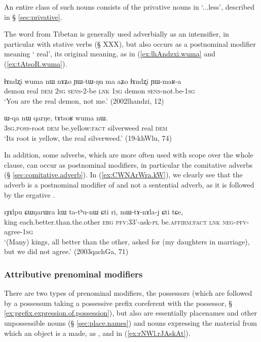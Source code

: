 An entire class of such nouns consists of the privative nouns in  `...less', described in § \ref{sec:privative}.

The word  from Tibetan  is generally used adverbially as an intensifier, in particular with stative verbs (§ XXX), but also occurs as a postnominal modifier meaning ` real', its original meaning, as in (\ref{ex:lhAndzxi.wuma} and (\ref{ex:tAtsoR.wuma}).

\begin{exe}
\ex \label{ex:lhAndzxi.wuma}
\gll ɬɤndʐi wuma nɯ nɤʑo ɲɯ-tɯ-ŋu ma aʑo ɬɤndʐi ɲɯ-maʁ-a \\
demon real \textsc{dem} \textsc{2sg} \textsc{sens}-2-be \textsc{lnk} \textsc{1sg} demon \textsc{sens}-not.be-\textsc{1sg} \\
\glt `You are the real demon, not me.' (2002lhandzi, 12)
\end{exe}

\begin{exe}
\ex \label{ex:tAtsoR.wuma}
\gll ɯ-qa nɯ qarŋe, tɤtsoʁ wuma nɯ. \\
\textsc{3sg}.\textsc{poss}-root \textsc{dem} be.yellow:\textsc{fact} silverweed real \textsc{dem} \\
\glt `Its root is yellow, the real silverweed.' (19-khWlu, 74)
\end{exe}

In addition, some adverbs, which are more often used with scope over the whole clause, can occur as postnominal modifiers, in particular the comitative adverbs (§ \ref{sec:comitative.adverb}). In (\ref{ex:CWNArWra.kW}), we clearly see that the adverb  is a postnominal modifier of  and not a sentential adverb, as it is followed by the ergative .

\begin{exe}
\ex \label{ex:CWNArWra.kW}
\gll   rɟɤlpu ɕɯŋarɯra kɯ ta-tʰu-nɯ ɕti ri, mɯ-tɤ-nɤla-j ɕti tɕe, \\
king each.better.than.the.other \textsc{erg} \textsc{pfv}:3\fl{}3'-ask-\textsc{pl} be.\textsc{affirm}:\textsc{fact} \textsc{lnk} \textsc{neg}-\textsc{pfv}-agree-\textsc{1sg} \\
\glt `(Many) kings, all better than the other, asked for (my daughters in marriage), but we did not agree.' (2003qachGa, 71)
\end{exe}

\subsubsection{Attributive prenominal modifiers}   \label{ex:attributive.prenominal}
There are two types of prenominal modifiers, the possessors (which are followed by a possessum taking a possessive prefix coreferent with the possessor, § \ref{ex:prefix.expression.of.possession}), but also   are essentially placenames and other unpossessible nouns (§ \ref{sec:place.names}) and nouns expressing the material from which an object is a made, as ,  and  
in (\ref{ex:rNWl.rJAskAt}).

